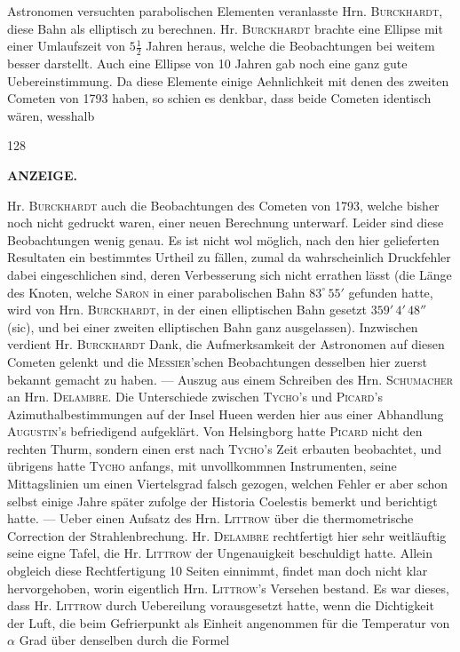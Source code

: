 Astronomen versuchten parabolischen Elementen veranlasste Hrn. \textsc{Burckhardt}, diese Bahn als elliptisch zu berechnen. Hr. \textsc{Burckhardt} brachte eine Ellipse mit einer Umlaufszeit von $5\tfrac{1}{2}$ Jahren heraus, welche die Beobachtungen bei weitem besser darstellt. Auch eine Ellipse von 10 Jahren gab noch eine ganz gute Uebereinstimmung. Da diese Elemente einige Aehnlichkeit mit denen des zweiten Cometen von 1793 haben, so schien es denkbar, dass beide Cometen identisch wären, wesshalb\par
\vfill
{}\hfill{\small 128}\hspace*{.18\textwidth}\par
\clearpage
{}
\noindent{}%
\parbox[b]{\dimexpr\textwidth-20mm\relax}{\centering\small\textbf{ANZEIGE.}}%
\makebox[10mm][r]{}\par\nobreak\medskip
\noindent Hr. \textsc{Burckhardt} auch die Beobachtungen des Cometen von 1793, welche bisher noch nicht gedruckt waren, einer neuen Berechnung unterwarf. Leider sind diese Beobachtungen wenig genau. Es ist nicht wol möglich, nach den hier gelieferten Resultaten ein bestimmtes Urtheil zu fällen, zumal da wahrscheinlich Druckfehler dabei eingeschlichen sind, deren Verbesserung sich nicht errathen lässt (die Länge des Knoten, welche \textsc{Saron} in einer parabolischen Bahn $83^\circ\,55'$ gefunden hatte, wird von Hrn. \textsc{Burckhardt}, in der einen elliptischen Bahn gesetzt $359'\,4'\,48''$ (sic), und bei einer zweiten elliptischen Bahn ganz ausgelassen). Inzwischen verdient Hr. \textsc{Burckhardt} Dank, die Aufmerksamkeit der Astronomen auf diesen Cometen gelenkt und die \textsc{Messier}'schen Beobachtungen desselben hier zuerst bekannt gemacht zu haben. --- Auszug aus einem Schreiben des Hrn. \textsc{Schumacher} an Hrn. \textsc{Delambre}. Die Unterschiede zwischen \textsc{Tycho}'s und \textsc{Picard}'s Azimuthalbestimmungen auf der Insel Hueen werden hier aus einer Abhandlung \textsc{Augustin}'s befriedigend aufgeklärt. Von Helsingborg hatte \textsc{Picard} nicht den rechten Thurm, sondern einen erst nach \textsc{Tycho}'s Zeit erbauten beobachtet, und übrigens hatte \textsc{Tycho} anfangs, mit unvollkommnen Instrumenten, seine Mittagslinien um einen Viertelsgrad falsch gezogen, welchen Fehler er aber schon selbst einige Jahre später zufolge der Historia Coelestis bemerkt und berichtigt hatte. --- Ueber einen Aufsatz des Hrn. \textsc{Littrow} über die thermometrische Correction der Strahlenbrechung. Hr. \textsc{Delambre} rechtfertigt hier sehr weitläuftig seine eigne Tafel, die Hr. \textsc{Littrow} der Ungenauigkeit beschuldigt hatte. Allein obgleich diese Rechtfertigung 10 Seiten einnimmt, findet man doch nicht klar hervorgehoben, worin eigentlich Hrn. \textsc{Littrow}'s Versehen bestand. Es war dieses, dass Hr. \textsc{Littrow} durch Uebereilung vorausgesetzt hatte, wenn die Dichtigkeit der Luft, die beim Gefrierpunkt als Einheit angenommen für die Temperatur von $\alpha$ Grad über denselben durch die Formel 
